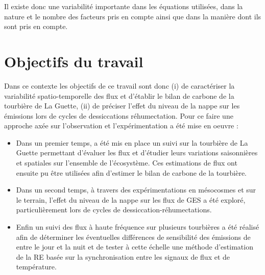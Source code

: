 Il existe donc une variabilité importante dans les équations utilisées, dans la nature et le nombre des facteurs pris en compte ainsi que dans la manière dont ils sont pris en compte.

\section{Objectifs du travail}
%
Dans ce contexte les objectifs de ce travail sont donc (i) de caractériser la variabilité spatio-temporelle des flux et d'établir le bilan de carbone de la tourbière de La Guette, (ii) de préciser l'effet du niveau de la nappe sur les émissions lors de cycles de dessiccations réhumectation.
Pour ce faire une approche axée sur l'observation et l'expérimentation a été mise en oeuvre : 
\begin{itemize}
\item Dans un premier temps, a été mis en place un suivi sur la tourbière de La Guette permettant d'évaluer les flux et d'étudier leurs variations saisonnières et spatiales sur l'ensemble de l'écosystème. Ces estimations de flux ont ensuite pu être utilisées afin d'estimer le bilan de carbone de la tourbière.
\item Dans un second temps, à travers des expérimentations en mésocosmes et sur le terrain, l'effet du niveau de la nappe sur les flux de GES a été exploré, particulièrement lors de cycles de dessiccation-réhumectations.
\item Enfin un suivi des flux à haute fréquence sur plusieurs tourbières a été réalisé afin de déterminer les éventuelles différences de sensibilité des émissions de \coo entre le jour et la nuit et de tester à cette échelle une méthode d'estimation de la RE basée sur la synchronisation entre les signaux de flux et de température.
\end{itemize}
